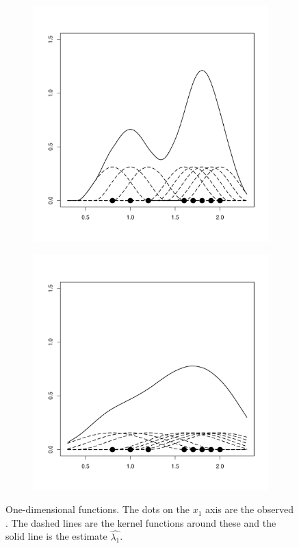 \begin{figure}[htbp]
\begin{subfigure}[t]{0.32\textwidth}
        \includegraphics[width=\textwidth]{img/kernel1d-04}
        \label{fig:theory:kernel1d:04}
    \end{subfigure}
    \begin{subfigure}[t]{0.32\textwidth}
        \includegraphics[width=\textwidth]{img/kernel1d-08}
        \label{fig:theory:kernel1d:08}
    \end{subfigure}
    \caption{One-dimensional  functions. The dots on the $x_1$ axis are the observed . The dashed lines are the kernel functions around these  and the solid line is the  estimate $\hat{\lambda_1}$.}
    \label{fig:theory:kernel1d}
\end{figure}

